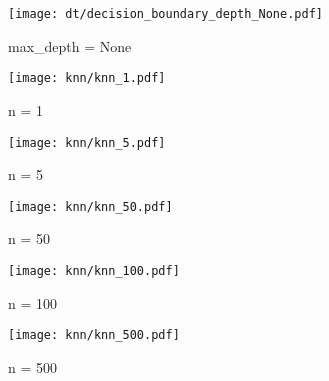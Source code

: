 \documentclass[acmconf,nonacm=true]{acmart}
\begin{document}
\begin{figure}[H]
    \centering  
    \texttt{[image: dt/decision\_boundary\_depth\_None.pdf]}
    \caption{max\_depth = None}
\end{figure}

\begin{figure}[H]
    \centering
    \texttt{[image: knn/knn\_1.pdf]}
    \caption{n = 1}
\end{figure}

\begin{figure}[H]
    \centering
    \texttt{[image: knn/knn\_5.pdf]}
    \caption{n = 5}
\end{figure}

\begin{figure}[H]
    \centering
    \texttt{[image: knn/knn\_50.pdf]}
    \caption{n = 50}
\end{figure}

\begin{figure}[H]
    \centering
    \texttt{[image: knn/knn\_100.pdf]}
    \caption{n = 100}
\end{figure}

\begin{figure}[H]
    \centering
    \texttt{[image: knn/knn\_500.pdf]}
    \caption{n = 500}
\end{figure}
\end{document}
